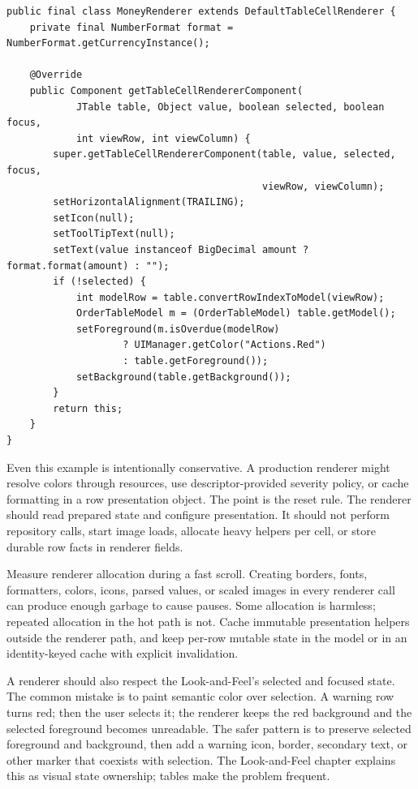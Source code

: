 \begin{lstlisting}[caption={A renderer that resets state explicitly.}]
public final class MoneyRenderer extends DefaultTableCellRenderer {
    private final NumberFormat format = NumberFormat.getCurrencyInstance();

    @Override
    public Component getTableCellRendererComponent(
            JTable table, Object value, boolean selected, boolean focus,
            int viewRow, int viewColumn) {
        super.getTableCellRendererComponent(table, value, selected, focus,
                                            viewRow, viewColumn);
        setHorizontalAlignment(TRAILING);
        setIcon(null);
        setToolTipText(null);
        setText(value instanceof BigDecimal amount ? format.format(amount) : "");
        if (!selected) {
            int modelRow = table.convertRowIndexToModel(viewRow);
            OrderTableModel m = (OrderTableModel) table.getModel();
            setForeground(m.isOverdue(modelRow)
                    ? UIManager.getColor("Actions.Red")
                    : table.getForeground());
            setBackground(table.getBackground());
        }
        return this;
    }
}
\end{lstlisting}

Even this example is intentionally conservative. A production renderer might resolve colors through resources, use descriptor-provided severity policy, or cache formatting in a row presentation object. The point is the reset rule. The renderer should read prepared state and configure presentation. It should not perform repository calls, start image loads, allocate heavy helpers per cell, or store durable row facts in renderer fields.

Measure renderer allocation during a fast scroll. Creating borders, fonts, formatters, colors, icons, parsed values, or scaled images in every renderer call can produce enough garbage to cause pauses. Some allocation is harmless; repeated allocation in the hot path is not. Cache immutable presentation helpers outside the renderer path, and keep per-row mutable state in the model or in an identity-keyed cache with explicit invalidation.

A renderer should also respect the Look-and-Feel's selected and focused state. The common mistake is to paint semantic color over selection. A warning row turns red; then the user selects it; the renderer keeps the red background and the selected foreground becomes unreadable. The safer pattern is to preserve selected foreground and background, then add a warning icon, border, secondary text, or other marker that coexists with selection. The Look-and-Feel chapter explains this as visual state ownership; tables make the problem frequent.

